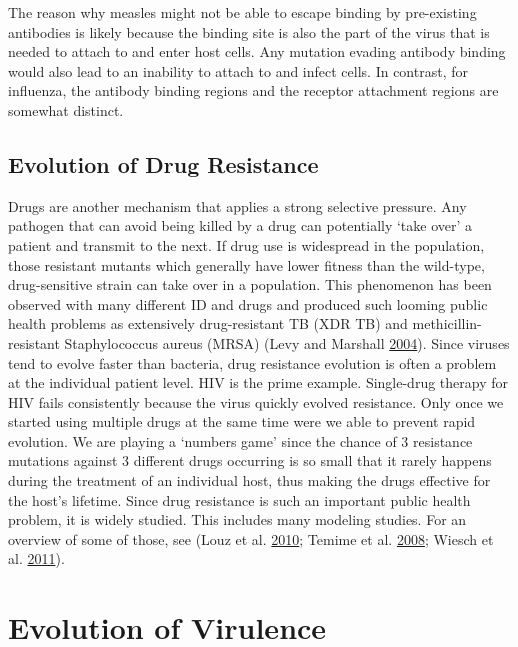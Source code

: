 \documentclass[]{book}
\theoremstyle{definition}
\theoremstyle{definition}
\theoremstyle{definition}
\theoremstyle{remark}
\begin{document}
The reason why measles might not be able to escape binding by
pre-existing antibodies is likely because the binding site is also the
part of the virus that is needed to attach to and enter host cells. Any
mutation evading antibody binding would also lead to an inability to
attach to and infect cells. In contrast, for influenza, the antibody
binding regions and the receptor attachment regions are somewhat
distinct.

\subsection{Evolution of Drug
Resistance}\label{evolution-of-drug-resistance}

Drugs are another mechanism that applies a strong selective pressure.
Any pathogen that can avoid being killed by a drug can potentially `take
over' a patient and transmit to the next. If drug use is widespread in
the population, those resistant mutants which generally have lower
fitness than the wild-type, drug-sensitive strain can take over in a
population. This phenomenon has been observed with many different ID and
drugs and produced such looming public health problems as extensively
drug-resistant TB (XDR TB) and methicillin-resistant Staphylococcus
aureus (MRSA) (Levy and Marshall \protect\hyperlink{ref-levy04}{2004}).
Since viruses tend to evolve faster than bacteria, drug resistance
evolution is often a problem at the individual patient level. HIV is the
prime example. Single-drug therapy for HIV fails consistently because
the virus quickly evolved resistance. Only once we started using
multiple drugs at the same time were we able to prevent rapid evolution.
We are playing a `numbers game' since the chance of 3 resistance
mutations against 3 different drugs occurring is so small that it rarely
happens during the treatment of an individual host, thus making the
drugs effective for the host's lifetime. Since drug resistance is such
an important public health problem, it is widely studied. This includes
many modeling studies. For an overview of some of those, see (Louz et
al. \protect\hyperlink{ref-louz10}{2010}; Temime et al.
\protect\hyperlink{ref-temime08}{2008}; Wiesch et al.
\protect\hyperlink{ref-wiesch11}{2011}).

\section{Evolution of Virulence}\label{evolution-of-virulence}
\end{document}
